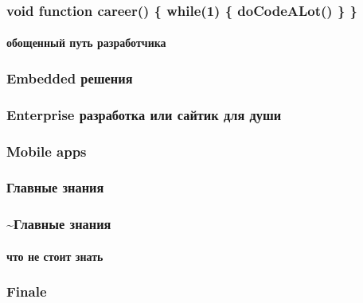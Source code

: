 \documentclass[10pt,pdf,hyperref={unicode}]{beamer}
\begin{document}
\begin{frame}
\frametitle{void function career() \{ while(1) \{ doCodeALot() \} \} }
\framesubtitle{ обощенный путь разработчика }
\end{frame}

\begin{frame}
\frametitle{ Embedded решения }
\end{frame}


\begin{frame}
\frametitle{Enterprise разработка или сайтик для души}
\end{frame}

\begin{frame}
\frametitle{ Mobile apps }
\end{frame}

\begin{frame}
\frametitle{ Главные знания }
\end{frame}

\begin{frame}
\frametitle{ \textasciitilde Главные знания }
\framesubtitle{ что не стоит знать }
\end{frame}

\begin{frame}
\frametitle{ Finale }
\end{frame}
\end{document}
